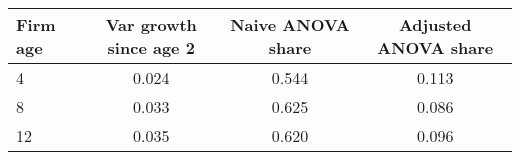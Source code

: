 \begin{tabular}{lccc}
Firm age & Var  growth since age 2 & Naive ANOVA share & Adjusted ANOVA share \\
\hline
4 &     0.024 &  0.544 &  0.113 \\
8 &     0.033 &  0.625 &  0.086 \\
12 &     0.035 &  0.620 &  0.096 \\
\end{tabular}
